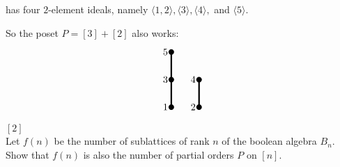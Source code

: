 \documentclass{article}
\newenvironment{problem}[2][Problem]{\begin{trivlist}
\item[\hskip \labelsep {\bfseries #1}\hskip \labelsep {\bfseries #2.}]}{\end{trivlist}}
\newenvironment{solution}[1][Solution.]{\begin{trivlist}
\item[\hskip \labelsep {\bfseries #1}]}{\end{trivlist}}
\newcommand{\ang}[1]{\langle #1 \rangle}
\begin{document}
\begin{solution}
\begin{enumerate}
    has four $2$-element ideals, namely $\ang{1, 2}, \ang 3, \ang 4,$ and $\ang 5$.
  \end{enumerate}
  So the poset $P = [3] + [2]$ also works: \[
    \begin{tikzpicture}
      \fill (0,0) circle (0.1) node[left] {1};
      \fill (0,1) circle (0.1) node[left] {3};
      \fill (1,0) circle (0.1) node[left] {2};
      \fill (1,1) circle (0.1) node[left] {4};
      \fill (0,2) circle (0.1) node[left] {5};
      \draw[ultra thick] (0,0)--(0,2);
      \draw[ultra thick] (1,0)--(1,1);
    \end{tikzpicture}
  \]
\end{solution}
\pagebreak
\begin{problem}{46 a} $[2]$ \\
  Let $f(n)$ be the number of sublattices of rank $n$ of the boolean algebra
  $B_n$. Show that $f(n)$ is also the number of partial orders $P$ on $[n]$.
\end{problem}
\end{document}
